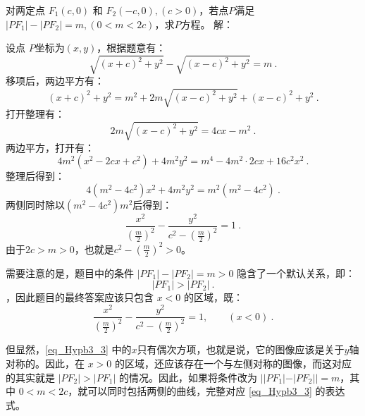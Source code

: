 \begin{example}{对两定点 $F_1(c, 0)$ 和 $F_2(-c, 0),(c>0)$，若点$P$满足$|PF_1| - |PF_2| = m,(0<m <2c)$，求$P$方程。}
解：

设点 $P$坐标为$(x, y)$，根据题意有：
\begin{equation}
\sqrt{(x + c)^2 + y^2} - \sqrt{(x - c)^2 + y^2} = m~.
\end{equation}
移项后，两边平方有：
\begin{equation}
(x + c)^2 + y^2 = m^2 + 2m\sqrt{(x - c)^2 + y^2} + (x - c)^2 + y^2~.
\end{equation}
打开整理有：
\begin{equation}
2m\sqrt{(x - c)^2 + y^2}= 4cx - m^2~.
\end{equation}
两边平方，打开有：
\begin{equation}\label{eq_Hypb3_6}
4m^2(x^2 - 2cx+c^2) + 4m^2y^2= m^4-4m^2\cdot2cx+16c^2x^2~.
\end{equation}
整理后得到：
\begin{equation}
4(m^2 -4c^2)x^2 + 4m^2y^2= m^2(m^2-4c^2)~.
\end{equation}
两侧同时除以$(m^2-4c^2)m^2$后得到：
\begin{equation}\label{eq_Hypb3_3}
\frac{x^2}{\left(\displaystyle\frac{m}{2}\right)^2} -\frac{y^2}{\displaystyle c^2-\left(\frac{m}{2}\right)^2}=1~.
\end{equation}
由于$2c>m>0$，也就是$\displaystyle c^2-\left(\frac{m}{2}\right)^2>0$。

需要注意的是，题目中的条件 $|PF_1| - |PF_2| = m > 0$ 隐含了一个默认关系，即：
\begin{equation}
|PF_1| > |PF_2|~.
\end{equation}
，因此题目的最终答案应该只包含 $x < 0$ 的区域，既：
\begin{equation}
\frac{x^2}{\left(\displaystyle\frac{m}{2}\right)^2} -\frac{y^2}{\displaystyle c^2-\left(\frac{m}{2}\right)^2}=1,\qquad(x<0)~.
\end{equation}

但显然，\autoref{eq_Hypb3_3} 中的$x$只有偶次方项，也就是说，它的图像应该是关于$y$轴对称的。因此，在 $x> 0$ 的区域，还应该存在一个与左侧对称的图像，而这对应的其实就是 $|PF_2| > |PF_1|$ 的情况。因此，如果将条件改为 $||PF_1| - |PF_2|| = m$，其中 $0 < m < 2c$，就可以同时包括两侧的曲线，完整对应 \autoref{eq_Hypb3_3} 的表达式。
\end{example}

